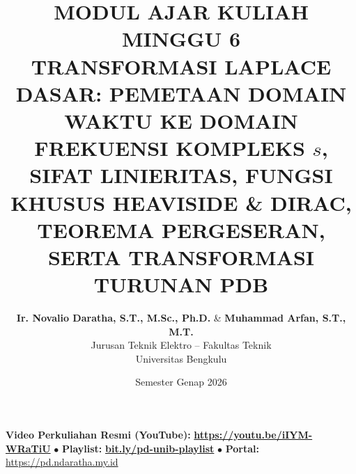 \documentclass[11pt,a4paper]{article}
\title{\textbf{\Large MODUL AJAR KULIAH MINGGU 6}\\[0.3cm]
\textbf{\LARGE TRANSFORMASI LAPLACE DASAR: PEMETAAN DOMAIN WAKTU KE DOMAIN FREKUENSI KOMPLEKS $s$, SIFAT LINIERITAS, FUNGSI KHUSUS HEAVISIDE \& DIRAC, TEOREMA PERGESERAN, SERTA TRANSFORMASI TURUNAN PDB}}
\author{\textbf{Ir. Novalio Daratha, S.T., M.Sc., Ph.D.} \& \textbf{Muhammad Arfan, S.T., M.T.} \\ 
Jurusan Teknik Elektro -- Fakultas Teknik \\ 
Universitas Bengkulu}
\date{Semester Genap 2026}
\theoremstyle{definition}
\begin{document}
\maketitle
\begin{center}
  \vspace{-0.25cm}
  \begin{tcolorbox}[colback=red!4!white,colframe=red!75!black,boxrule=0.5pt,arc=2pt,left=6pt,right=6pt,top=3pt,bottom=3pt,width=0.98\textwidth]
    \centering\footnotesize
    \textbf{Video Perkuliahan Resmi (YouTube):} {\color{red!80!black}\textbf{\url{https://youtu.be/iIYM-WRaTiU}}} \quad $\bullet$ \quad \textbf{Playlist:} \href{https://www.youtube.com/playlist?list=PLS5oOZWXZeTw}{\color{blue!80!black}\textbf{bit.ly/pd-unib-playlist}} \quad $\bullet$ \quad \textbf{Portal:} \url{https://pd.ndaratha.my.id}
  \end{tcolorbox}
  \vspace{-0.15cm}
\end{center}
\end{document}
